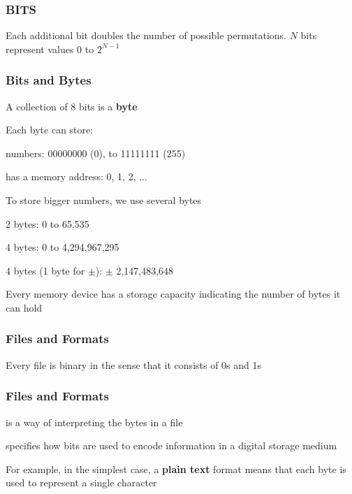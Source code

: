 \documentclass[12pt]{beamer}\usepackage[]{graphicx}\usepackage[]{color}
\begin{document}

\begin{frame}[fragile]
\frametitle{BITS}
\begin{center}
\bigskip

{\tiny Each additional bit doubles the number of possible permutations. $N$ bits represent values 0 to $2^{N-1}$}
\end{center}
\end{frame}


\begin{frame}
\frametitle{Bits and Bytes}

\bbi
  \item A collection of 8 bits is a \textbf{byte}
  \item Each byte can store:
  \bi
    \item numbers: 00000000 (0), to 11111111 (255)
    \item has a memory address: 0, 1, 2, ...
  \ei
  \item To store bigger numbers, we use several bytes
  \bi
    \item 2 bytes: 0 to 65,535
    \item 4 bytes: 0 to 4,294,967,295
    \item 4 bytes (1 byte for $\pm$): $\pm$ 2,147,483,648
  \ei
  \item Every memory device has a storage capacity indicating the number of bytes it can hold
\ei

\end{frame}


\begin{frame}
\frametitle{Files and Formats}

\begin{center}
\end{center}
Every file is binary in the sense that it consists of 0s and 1s

\end{frame}


\begin{frame}
\frametitle{Files and Formats}

\bbi
  \item is a way of interpreting the bytes in a file
  \item specifies how bits are used to encode information in a digital storage medium
  \item For example, in the simplest case, a \textbf{plain text} format means that each byte is used to represent a single character
\ei
\eb

\end{frame}
\end{document}
